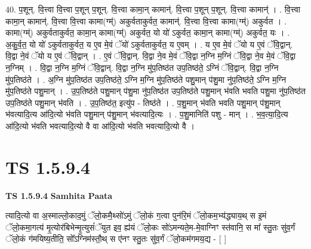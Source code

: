 \documentclass[17pt]{extarticle}
\begin{document}
40. प॒शून्. वि॒त्त्वा वि॒त्त्वा प॒शून् प॒शून्. वि॒त्त्वा कामा॒न् कामान्॑. वि॒त्त्वा प॒शून् प॒शून्. वि॒त्त्वा कामान्॑ । . वि॒त्त्वा कामा॒न् कामान्॑. वि॒त्त्वा वि॒त्त्वा कामा(ग्म्॑) अकुर्वताकुर्वत॒ कामान्॑. वि॒त्त्वा वि॒त्त्वा कामा(ग्म्॑) अकुर्वत । . कामा(ग्म्॑) अकुर्वताकुर्वत॒ कामा॒न् कामा(ग्म्॑) अकुर्वत॒ यो यो॑ ऽकुर्वत॒ कामा॒न् कामा(ग्म्॑) अकुर्वत॒ यः । . अ॒कु॒र्व॒त॒ यो यो॑ ऽकुर्वताकुर्वत॒ य ए॒व मे॒वं ॅयो॑ ऽकुर्वताकुर्वत॒ य ए॒वम् । . य ए॒व मे॒वं ॅयो य ए॒वं ॅवि॒द्वान्. वि॒द्वा ने॒वं ॅयो य ए॒वं ॅवि॒द्वान् । . ए॒वं ॅवि॒द्वान्. वि॒द्वा ने॒व मे॒वं ॅवि॒द्वा न॒ग्नि म॒ग्निं ॅवि॒द्वा ने॒व मे॒वं ॅवि॒द्वा न॒ग्निम् । . वि॒द्वा न॒ग्नि म॒ग्निं ॅवि॒द्वान्. वि॒द्वा न॒ग्नि मु॑प॒तिष्ठ॑त उप॒तिष्ठ॑ते॒ ऽग्निं ॅवि॒द्वान्. वि॒द्वा न॒ग्नि मु॑प॒तिष्ठ॑ते । . अ॒ग्नि मु॑प॒तिष्ठ॑त उप॒तिष्ठ॑ते॒ ऽग्नि म॒ग्नि मु॑प॒तिष्ठ॑ते पशु॒मान् प॑शु॒मा नु॑प॒तिष्ठ॑ते॒ ऽग्नि म॒ग्नि मु॑प॒तिष्ठ॑ते पशु॒मान् । . उ॒प॒तिष्ठ॑ते पशु॒मान् प॑शु॒मा नु॑प॒तिष्ठ॑त उप॒तिष्ठ॑ते पशु॒मान् भ॑वति भवति पशु॒मा नु॑प॒तिष्ठ॑त उप॒तिष्ठ॑ते पशु॒मान् भ॑वति । . उ॒प॒तिष्ठ॑त॒ इत्यु॑प - तिष्ठ॑ते । . प॒शु॒मान् भ॑वति भवति पशु॒मान् प॑शु॒मान् भ॑वत्यादि॒त्य आ॑दि॒त्यो भ॑वति पशु॒मान् प॑शु॒मान् भ॑वत्यादि॒त्यः । . प॒शु॒मानिति॑ पशु - मान् । . भ॒व॒त्या॒दि॒त्य आ॑दि॒त्यो भ॑वति भवत्यादि॒त्यो वै वा आ॑दि॒त्यो भ॑वति भवत्यादि॒त्यो वै । \newline
\pagebreak
{}

\section{ TS 1.5.9.4 }

\textbf{TS 1.5.9.4 } \newline
\textbf{Samhita Paata} \newline

त्यादि॒त्यो वा अ॒स्माल्लो॒काद॒मुं ॅलो॒कमै॒थ्सो॑ऽमुं ॅलो॒कं ग॒त्वा पुन॑रि॒मं ॅलो॒कम॒भ्य॑द्ध्याय॒थ् स इ॒मं ॅलो॒कमा॒गत्य॑ मृ॒त्योर॑बिभेन्मृ॒त्युसं॑ॅयुत इव॒ ह्य॑यं ॅलो॒कः सो॑ऽमन्यते॒म-मे॒वाग्निꣳ स्त॑वानि॒ स मा᳚ स्तु॒तः सु॑व॒र्गं ॅलो॒कं ग॑मयिष्य॒तीति॒ सो᳚ऽग्निम॑स्तौ॒थ् स ए॑नꣳ स्तु॒तः सु॑व॒र्गं ॅलो॒कम॑गमय॒द्य - [ ] \newline
\end{document}
